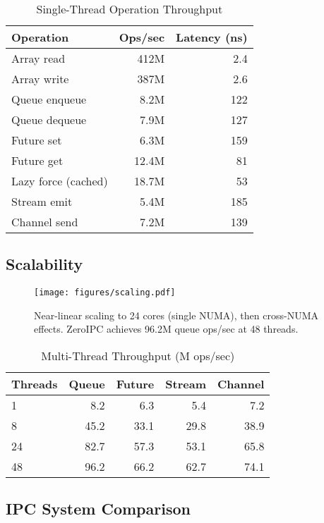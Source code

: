 \documentclass[sigconf,anonymous]{acmart}
\begin{document}
\begin{table}[h]
\centering
\caption{Single-Thread Operation Throughput}
\label{tab:throughput}
\begin{tabular}{lrr}
\toprule
Operation & Ops/sec & Latency (ns) \\
\midrule
Array read & 412M & 2.4 \\
Array write & 387M & 2.6 \\
Queue enqueue & 8.2M & 122 \\
Queue dequeue & 7.9M & 127 \\
Future set & 6.3M & 159 \\
Future get & 12.4M & 81 \\
Lazy force (cached) & 18.7M & 53 \\
Stream emit & 5.4M & 185 \\
Channel send & 7.2M & 139 \\
\bottomrule
\end{tabular}
\end{table}

\subsection{Scalability}

\begin{figure}[h]
\centering
\texttt{[image: figures/scaling.pdf]}
\caption{Near-linear scaling to 24 cores (single NUMA), then cross-NUMA effects. ZeroIPC achieves 96.2M queue ops/sec at 48 threads.}
\label{fig:scaling}
\end{figure}

\begin{table}[h]
\centering
\caption{Multi-Thread Throughput (M ops/sec)}
\label{tab:scaling}
\begin{tabular}{lrrrr}
\toprule
Threads & Queue & Future & Stream & Channel \\
\midrule
1 & 8.2 & 6.3 & 5.4 & 7.2 \\
8 & 45.2 & 33.1 & 29.8 & 38.9 \\
24 & 82.7 & 57.3 & 53.1 & 65.8 \\
48 & 96.2 & 66.2 & 62.7 & 74.1 \\
\bottomrule
\end{tabular}
\end{table}

\subsection{IPC System Comparison}
\end{document}
